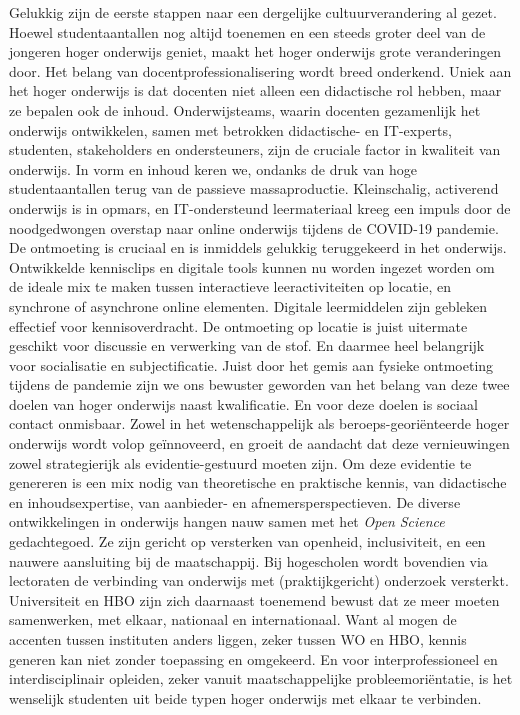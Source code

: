\documentclass[smallauthor, chapterhaspagenum, nochapterinheader, pagenuminheader,  bigchapnum,medium2, tocpages, garamond, titleinheader]{jote-book}
\begin{document}
	\enlargethispage{-\baselineskip}\checkandfixthelayout

	Gelukkig zijn de eerste stappen naar een dergelijke cultuurverandering al gezet. Hoewel studentaantallen nog altijd toenemen en een steeds groter deel van de jongeren hoger onderwijs geniet, maakt het hoger onderwijs grote veranderingen door. Het belang van docentprofessionalisering wordt breed onderkend. Uniek aan het hoger onderwijs is dat docenten niet alleen een didactische rol hebben, maar ze bepalen ook de inhoud. Onderwijsteams, waarin docenten gezamenlijk het onderwijs ontwikkelen, samen met betrokken didactische- en IT-experts, studenten, stakeholders en ondersteuners, zijn de cruciale factor in kwaliteit van onderwijs. In vorm en inhoud keren we, ondanks de druk van hoge studentaantallen terug van de passieve massaproductie. Kleinschalig, activerend onderwijs is in opmars, en IT-ondersteund leermateriaal kreeg een impuls door de noodgedwongen overstap naar online onderwijs tijdens de COVID-19 pandemie. De ontmoeting is cruciaal en is inmiddels gelukkig teruggekeerd in het onderwijs. Ontwikkelde kennisclips en digitale tools kunnen nu worden ingezet worden om de ideale mix te maken tussen interactieve leeractiviteiten op locatie, en synchrone of asynchrone online elementen. Digitale leermiddelen zijn gebleken effectief voor kennisoverdracht. De ontmoeting op locatie is juist uitermate geschikt voor discussie en verwerking van de stof. En daarmee heel belangrijk voor socialisatie en subjectificatie. Juist door het gemis aan fysieke ontmoeting tijdens de pandemie zijn we ons bewuster geworden van het belang van deze twee doelen van hoger onderwijs naast kwalificatie. En voor deze doelen is sociaal contact onmisbaar. Zowel in het wetenschappelijk als beroeps-georiënteerde hoger onderwijs wordt volop geïnnoveerd, en groeit de aandacht dat deze vernieuwingen zowel strategierijk als evidentie-gestuurd moeten zijn. Om deze evidentie te genereren is een mix nodig van theoretische en praktische kennis, van didactische en inhoudsexpertise, van aanbieder- en afnemersperspectieven. De diverse ontwikkelingen in onderwijs hangen nauw samen met het \emph{Open }\emph{Science} gedachtegoed. Ze zijn gericht op versterken van openheid, inclusiviteit, en een nauwere aansluiting bij de maatschappij. Bij hogescholen wordt bovendien via lectoraten de verbinding van onderwijs met (praktijkgericht) onderzoek versterkt. Universiteit en HBO zijn zich daarnaast toenemend bewust dat ze meer moeten samenwerken, met elkaar, nationaal en internationaal. Want al mogen de accenten tussen instituten anders liggen, zeker tussen WO en HBO, kennis generen kan niet zonder toepassing en omgekeerd. En voor interprofessioneel en interdisciplinair opleiden, zeker vanuit maatschappelijke probleemoriëntatie, is het wenselijk studenten uit beide typen hoger onderwijs met elkaar te verbinden.
\end{document}
